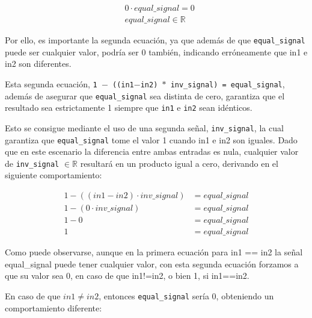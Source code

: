 \documentclass[a4paper,12pt]{report}
\begin{document}
	\begin{equation}
		\begin{aligned}
			&0 \cdot equal\_signal = 0 \\
			&equal\_signal \in \mathbb{R}
		\end{aligned}
	\end{equation}
	
	\vspace{0.2cm}
	\noindent Por ello, es importante la segunda ecuación, ya que además de que \texttt{equal\_signal} puede ser cualquier valor, podría ser 0 también, indicando erróneamente que in1 e in2 son diferentes.
	
	\vspace{0.2cm}
	\noindent Esta segunda ecuación, \texttt{1 $-$ ((in1$-$in2) $*$ inv\_signal) = equal\_signal}, además de asegurar que \texttt{equal\_signal} sea distinta de cero, garantiza que el resultado sea estrictamente 1 siempre que \texttt{in1} e \texttt{in2} sean idénticos.
	
	\vspace{0.2cm}
	\noindent Esto se consigue mediante el uso de una segunda señal, \texttt{inv\_signal}, la cual garantiza que \texttt{equal\_signal} tome el valor 1 cuando in1 e in2 son iguales. Dado que en este escenario la diferencia entre ambas entradas es nula, cualquier valor de \texttt{inv\_signal} $\in \mathbb{R}$ resultará en un producto igual a cero, derivando en el siguiente comportamiento:
	
	\begin{equation}
		\begin{aligned}
			1 - ((in1 - in2) \cdot inv\_signal) &= equal\_signal \\
			1 - (0 \cdot inv\_signal) &= equal\_signal \\
			1 - 0 &= equal\_signal \\
			1 &= equal\_signal
		\end{aligned}
	\end{equation}
	
	\vspace{0.2cm}
	\noindent Como puede observarse, aunque en la primera ecuación para in1 == in2 la señal equal\_signal puede tener cualquier valor, con esta segunda ecuación forzamos a que su valor sea 0, en caso de que in1!=in2, o bien 1, si in1==in2.
	
	\vspace{0.2cm}
	\noindent En caso de que $in1 \neq in2$, entonces \texttt{equal\_signal} sería 0, obteniendo un comportamiento diferente:
	
\end{document}
